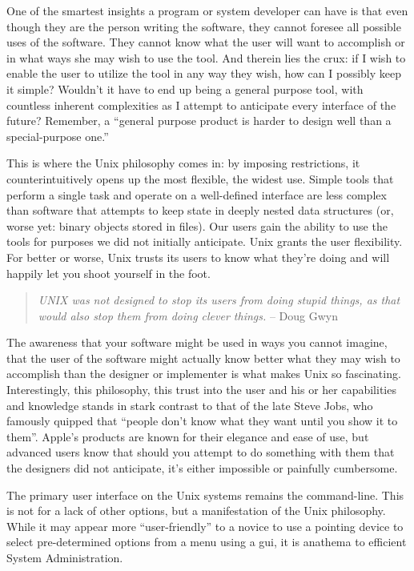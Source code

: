 One of the smartest insights a program or system
developer can have is that even though they are the
person writing the software, they cannot foresee all
possible uses of the software.  They cannot know what
the user will want to accomplish or in what ways she
may wish to use the tool.  And therein lies the crux:
if I wish to enable the user to utilize the tool in
any way they wish, how can I possibly keep it simple?
Wouldn't it have to end up being a general purpose
tool, with countless inherent complexities as I
attempt to anticipate every interface of the future?
Remember, a ``general purpose product is harder to
design well than a special-purpose
one.''\cite{history:brooks-design}

This is where the Unix philosophy comes in: by
imposing restrictions, it counterintuitively opens up
the most flexible, the widest use.  Simple tools that
perform a single task and operate on a well-defined
interface are less complex than software that attempts
to keep state in deeply nested data structures (or,
worse yet: binary objects stored in files).  Our users
gain the ability to use the tools for purposes we did
not initially anticipate.  Unix grants the user
flexibility.  For  better or worse, Unix trusts its
users to know what they're doing and will happily let
you shoot yourself in the foot.

\begin{quote}
{\em \textsc{UNIX} was not designed to
stop its users from doing stupid things, as that would
also stop them from doing clever things.} -- Doug
Gwyn
\end{quote}



The awareness that your software might be used in ways
you cannot imagine, that the user of the software
might actually know better what they may wish to
accomplish than the designer or implementer is what
makes Unix so fascinating.  Interestingly, this
philosophy, this trust into the user and his or her
capabilities and knowledge stands in stark contrast
to that of the late Steve Jobs, who famously quipped that ``people don't know
what they want until you show it to
them''\cite{history:jobs}.  Apple's products are known
for their elegance and ease of use, but advanced users
know that should you attempt to do something with them
that the designers did not anticipate, it's either
impossible or painfully cumbersome.

The primary user interface on the Unix systems remains
the command-line.  This is not for a lack
of other options, but a manifestation of the Unix
philosophy.  While it may appear more
``user-friendly'' to a novice to use a pointing device
to select pre-determined options from a menu using a
\gls{gui}, it is anathema to efficient System
Administration.

